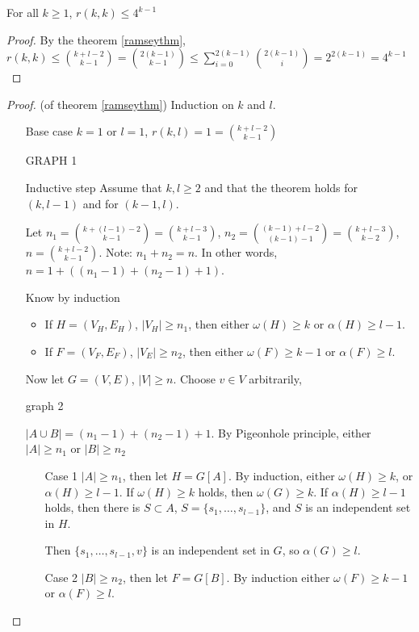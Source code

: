 \documentclass{article}
\begin{document}
\begin{cor}
For all $k \ge 1$, $r(k,k) \le 4^{k-1} $
\end{cor}
\begin{proof}
By the theorem \ref{ramseythm}, $r(k,k) \le {k + l -2 \choose k-1} = {2(k-1) \choose k-1} \le \sum_{i=0}^{2(k-1)} {2(k-1) \choose i} = 2^{2(k-1)}= 4^{k-1}$
\end{proof}

\begin{proof}
(of theorem \ref{ramseythm}) Induction on $k$ and $l$.
\begin{itemize}
 \item[Base case] $k=1$ or $l=1$, $r(k,l)=1 = {k+l -2 \choose k-1}$

GRAPH 1

\item[Inductive step] Assume that $k,l \ge 2$ and that the theorem holds for $(k,l-1)$ and for $(k-1,l)$.

Let $n_1 = {k + (l-1) -2 \choose k-1} = {k + l -3 \choose k-1}$, $n_2 = {(k-1) + l-2 \choose (k-1) -1} = {k+l -3 \choose k-2}$, $n={k+l-2 \choose k-1}$.  Note: $n_1 +n_2 = n$.  In other words, $n = 1 + ((n_1 -1) + (n_2 -1) +1)$.

Know by induction
\begin{itemize}
\item If $H= (V_H, E_H)$, $|V_H| \ge n_1$, then either $\omega(H) \ge k$ or $ \alpha(H) \ge l-1$.
\item If $F=(V_F, E_F)$, $|V_E| \ge n_2$, then either $\omega(F) \ge k-1$ or $\alpha(F) \ge l$.
\end{itemize}

Now let $G=(V,E)$, $|V| \ge n$.  Choose $v \in V$ arbitrarily, 

graph 2

$|A \cup B| = (n_1 -1 ) + (n_2 -1 ) +1$.  By Pigeonhole principle, either $|A| \ge n_1$ or $|B| \ge n_2$

\begin{itemize}
\item[Case 1] $|A| \ge n_1$, then let $H= G[A]$.  By induction, either $\omega(H) \ge k$, or $\alpha(H) \ge l-1$.  If $\omega(H) \ge k$ holds, then $\omega(G) \ge k$.  If $\alpha(H) \ge l-1$ holds, then there is $S \subset A$, $S = \{ s_1, \ldots, s_{l-1}\}$, and $S$ is an independent set in $H$. 

 Then $\{s_1, \ldots , s_{l-1}, v \}$ is an independent set in $G$, so $\alpha(G) \ge l$.

\item[Case 2] $|B| \ge n_2$, then let $F= G[B]$.  By induction either $\omega(F) \ge k-1$ or $\alpha(F) \ge l$. 


\end{itemize}
\end{itemize}
\end{proof}
\end{document}
